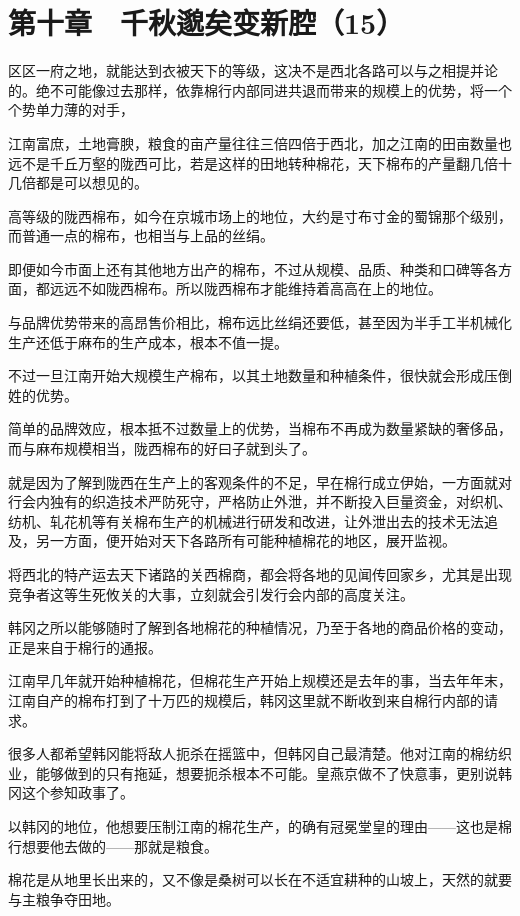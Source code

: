 \section{第十章　千秋邈矣变新腔（15）}

区区一府之地，就能达到衣被天下的等级，这决不是西北各路可以与之相提并论的。绝不可能像过去那样，依靠棉行内部同进共退而带来的规模上的优势，将一个个势单力薄的对手，

江南富庶，土地膏腴，粮食的亩产量往往三倍四倍于西北，加之江南的田亩数量也远不是千丘万壑的陇西可比，若是这样的田地转种棉花，天下棉布的产量翻几倍十几倍都是可以想见的。

高等级的陇西棉布，如今在京城市场上的地位，大约是寸布寸金的蜀锦那个级别，而普通一点的棉布，也相当与上品的丝绢。

即便如今市面上还有其他地方出产的棉布，不过从规模、品质、种类和口碑等各方面，都远远不如陇西棉布。所以陇西棉布才能维持着高高在上的地位。

与品牌优势带来的高昂售价相比，棉布远比丝绢还要低，甚至因为半手工半机械化生产还低于麻布的生产成本，根本不值一提。

不过一旦江南开始大规模生产棉布，以其土地数量和种植条件，很快就会形成压倒姓的优势。

简单的品牌效应，根本抵不过数量上的优势，当棉布不再成为数量紧缺的奢侈品，而与麻布规模相当，陇西棉布的好曰子就到头了。

就是因为了解到陇西在生产上的客观条件的不足，早在棉行成立伊始，一方面就对行会内独有的织造技术严防死守，严格防止外泄，并不断投入巨量资金，对织机、纺机、轧花机等有关棉布生产的机械进行研发和改进，让外泄出去的技术无法追及，另一方面，便开始对天下各路所有可能种植棉花的地区，展开监视。

将西北的特产运去天下诸路的关西棉商，都会将各地的见闻传回家乡，尤其是出现竞争者这等生死攸关的大事，立刻就会引发行会内部的高度关注。

韩冈之所以能够随时了解到各地棉花的种植情况，乃至于各地的商品价格的变动，正是来自于棉行的通报。

江南早几年就开始种植棉花，但棉花生产开始上规模还是去年的事，当去年年末，江南自产的棉布打到了十万匹的规模后，韩冈这里就不断收到来自棉行内部的请求。

很多人都希望韩冈能将敌人扼杀在摇篮中，但韩冈自己最清楚。他对江南的棉纺织业，能够做到的只有拖延，想要扼杀根本不可能。皇燕京做不了快意事，更别说韩冈这个参知政事了。

以韩冈的地位，他想要压制江南的棉花生产，的确有冠冕堂皇的理由——这也是棉行想要他去做的——那就是粮食。

棉花是从地里长出来的，又不像是桑树可以长在不适宜耕种的山坡上，天然的就要与主粮争夺田地。

